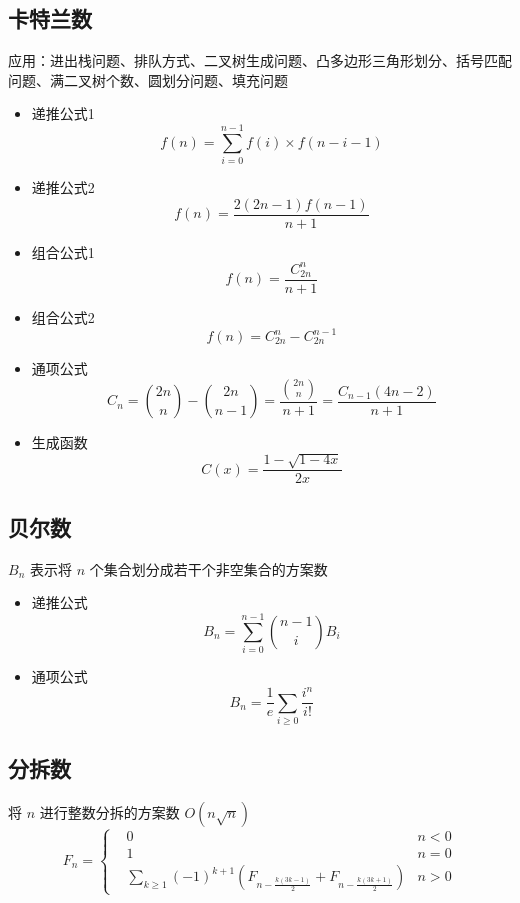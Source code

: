 \subsection{卡特兰数}
应用：进出栈问题、排队方式、二叉树生成问题、凸多边形三角形划分、括号匹配问题、满二叉树个数、圆划分问题、填充问题
\begin{itemize}
	\item 递推公式1 \\
		$$
		f(n) = \sum_{i = 0}^{n - 1} f(i) \times f(n - i - 1)
		$$
	\item 递推公式2 \\
		$$
		f(n) = \frac{2(2n - 1)f(n - 1)}{n + 1}
		$$
	\item 组合公式1 \\
		$$
		f(n) = \frac{C_{2n}^n}{n + 1}
		$$
	\item 组合公式2 \\
		$$
		f(n) = C_{2n}^{n} - C_{2n}^{n - 1}
		$$
	\item 通项公式 \\
		$$
		C_n = \binom{2n}{n} - \binom{2n}{n - 1}  = \frac{\binom{2n}{n}}{n + 1} = \frac{C_{n-1} (4n - 2)}{n + 1}
		$$
	\item 生成函数 \\
		$$
		C(x) = \frac{1 - \sqrt{1 - 4x}}{2x}
		$$
\end{itemize}
\subsection{贝尔数}
$B_n$ 表示将 $n$ 个集合划分成若干个非空集合的方案数
\begin{itemize}
	\item 递推公式 \\
		$$
		B_n = \sum_{i = 0}^{n - 1} \binom{n - 1}{i} B_i
		$$
	\item 通项公式 \\
		$$
		B_n = \frac{1}{e} \sum_{i \geq 0} \frac{i^n}{i!}
		$$
\end{itemize}
\subsection{分拆数}
将 $n$ 进行整数分拆的方案数 $O(n\sqrt{n})$
$$
F_n = \left\{
	\begin{aligned}
		& 0 & n < 0 \\
		& 1 & n = 0 \\
		& \sum_{k \geq 1} (-1)^{k + 1} \left(F_{n - \frac{k(3k - 1)}{2}} + F_{n - \frac{k(3k + 1)}{2}}\right) & n > 0
	\end{aligned}
	\right.
$$
